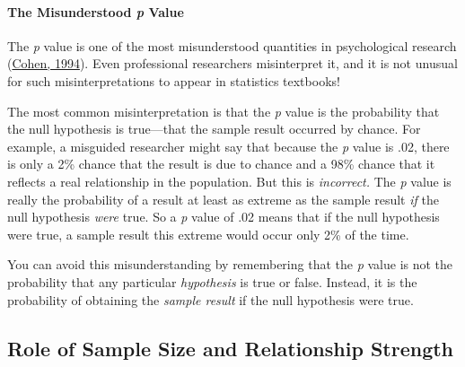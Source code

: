 \documentclass[
]{krantz}
\begin{document}
\hypertarget{the-misunderstood-p-value}{%
\paragraph*{\texorpdfstring{The Misunderstood \emph{p} Value}{The Misunderstood p Value}}\label{the-misunderstood-p-value}}

The \emph{p} value is one of the most misunderstood quantities in psychological research (\protect\hyperlink{ref-cohen1994earth}{Cohen, 1994}). Even professional researchers misinterpret it, and it is not unusual for such misinterpretations to appear in statistics textbooks!

The most common misinterpretation is that the \emph{p} value is the probability that the null hypothesis is true---that the sample result occurred by chance. For example, a misguided researcher might say that because the \emph{p} value is .02, there is only a 2\% chance that the result is due to chance and a 98\% chance that it reflects a real relationship in the population. But this is \emph{incorrect.} The \emph{p} value is really the probability of a result at least as extreme as the sample result \emph{if} the null hypothesis \emph{were} true. So a \emph{p} value of .02 means that if the null hypothesis were true, a sample result this extreme would occur only 2\% of the time.

You can avoid this misunderstanding by remembering that the \emph{p} value is not the probability that any particular \emph{hypothesis} is true or false. Instead, it is the probability of obtaining the \emph{sample result} if the null hypothesis were true.

\hypertarget{role-of-sample-size-and-relationship-strength}{%
\subsection*{Role of Sample Size and Relationship Strength}\label{role-of-sample-size-and-relationship-strength}}
\end{document}
